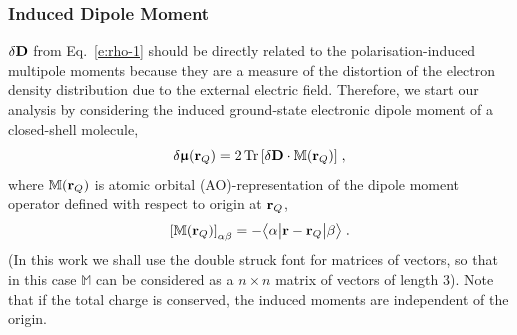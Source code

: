 \documentclass[aip,amsmath,amssymb,reprint,floatfix]{revtex4-1}
\newcommand{\tbraket}[3]{\ensuremath{\bigl\langle {#1} \bigl\lvert {#2} \bigl\lvert {#3} \bigr\rangle}}
\newcommand{\BM}[1]{\bm{#1}}
\DeclareMathOperator{\Tr}{Tr}
\begin{document}
\subsubsection{Induced Dipole Moment}

$\delta {\bf D}$ from Eq.~\eqref{e:rho-1} should 
be directly related to the
polarisation\hyp{}induced multipole moments because they are
a measure of the distortion of the electron density distribution due to the external electric
field. 
Therefore, we start our analysis by considering the induced 
ground\hyp{}state electronic dipole moment of a closed\hyp{}shell molecule, 
%
\begin{equation} \label{e:dmu-exact}
 \delta {\BM{\upmu}}({\bf r}_Q) = 
     2 \Tr{ 
         \left[ 
              \delta {\bf D} \cdot {\mathbb{M}({\bf r}_Q)}
         \right] } \;,
\end{equation}
%
where ${\mathbb{M}({\bf r}_Q)}$ is atomic orbital (AO)\hyp{}representation
of the dipole moment operator defined with respect to origin at ${\bf r}_Q$,
%
\begin{equation}\label{e:m}
 \left[ {\mathbb{M}({\bf r}_Q)} \right]_{\alpha\beta} = -\tbraket{\alpha}{{\bf r} - {\bf r}_Q}{\beta} \;.
\end{equation}
%
(In this work we shall use the double struck font for matrices of vectors, so that
in this case ${\mathbb{M}}$ can be considered as a $n \times n$ matrix of vectors of length 3).
Note that if the total charge is conserved, the induced moments are independent of the origin.
\end{document}
